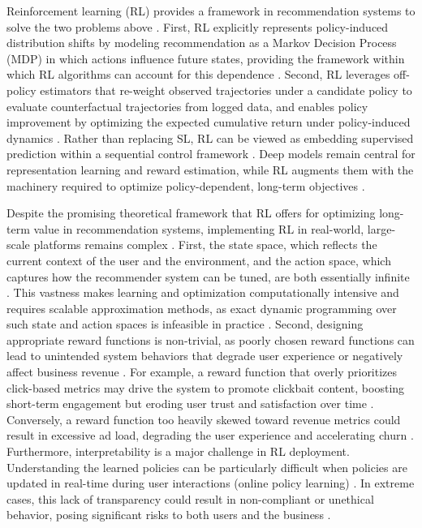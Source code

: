 \documentclass[manuscript,review,screen]{acmart}
\begin{document}
Reinforcement learning (RL) provides a framework in recommendation systems to solve the two problems above \cite{afsar2022reinforcement}. First, RL explicitly represents policy-induced distribution shifts by modeling recommendation as a Markov Decision Process (MDP) in which actions influence future states, providing the framework within which RL algorithms can account for this dependence \cite{Sutton1998}. Second, RL leverages off-policy estimators that re-weight observed trajectories under a candidate policy to evaluate counterfactual trajectories from logged data, and enables policy improvement by optimizing the expected cumulative return under policy-induced dynamics \cite{swaminathan2015counterfactual}. Rather than replacing SL, RL can be viewed as embedding supervised prediction within a sequential control framework \cite{chen2022off}. Deep models remain central for representation learning and reward estimation, while RL augments them with the machinery required to optimize policy-dependent, long-term objectives \cite{dulac2021challenges, levine2020offline}.

Despite the promising theoretical framework that RL offers for optimizing long-term value in recommendation systems, implementing RL in real-world, large-scale platforms remains complex \cite{dulac2021challenges}. First, the state space, which reflects the current context of the user and the environment, and the action space, which captures how the recommender system can be tuned, are both essentially infinite \cite{zhu2021overview}. This vastness makes learning and optimization computationally intensive and requires scalable approximation methods, as exact dynamic programming over such state and action spaces is infeasible in practice \cite{afsar2022reinforcement}. Second, designing appropriate reward functions is non-trivial, as poorly chosen reward functions can lead to unintended system behaviors that degrade user experience or negatively affect business revenue \cite{everitt2021reward}. For example, a reward function that overly prioritizes click-based metrics may drive the system to promote clickbait content, boosting short-term engagement but eroding user trust and satisfaction over time \cite{wu2017returning}. Conversely, a reward function too heavily skewed toward revenue metrics could result in excessive ad load, degrading the user experience and accelerating churn \cite{sagtani2024ad}. Furthermore, interpretability is a major challenge in RL deployment. Understanding the learned policies can be particularly difficult when policies are updated in real-time during user interactions (online policy learning) \cite{glanois2024survey, vouros2022explainable, dulac2021challenges}. In extreme cases, this lack of transparency could result in non-compliant or unethical behavior, posing significant risks to both users and the business \cite{lambert2023entangled}.
\end{document}
